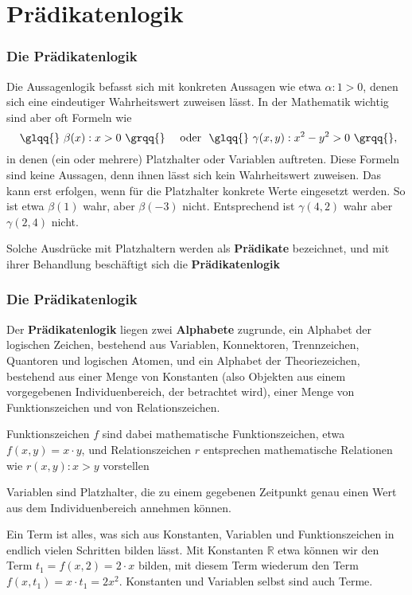 \documentclass[hyperref={pdfpagelabels=false}]{beamer}
\theoremstyle{plain}%
\theoremstyle{definition}
\theoremstyle{remark}
\begin{document}
\section{Prädikatenlogik}

\begin{frame}
\frametitle{Die Prädikatenlogik}

Die Aussagenlogik befasst sich mit konkreten Aussagen wie etwa \glqq{}$\alpha: 1>0$\grqq{}, denen sich 
eine eindeutiger Wahrheitswert zuweisen lässt. In der Mathematik  wichtig sind aber oft Formeln 
wie 
	$$ \text{ \glqq{} } \beta(x): x >0 \,\,\text{\grqq{}} \quad \text{ oder } \,\, 
	\text{\glqq{}}\,\, \gamma(x,y): x^2-y^2 > 0\,\,  \text{\grqq{}}, $$ 
in denen 
(ein oder mehrere) Platzhalter oder Variablen auftreten. \pause Diese Formeln sind keine Aussagen, 
denn ihnen lässt sich kein Wahrheitswert zuweisen. Das kann erst erfolgen, wenn für die Platzhalter 
konkrete Werte eingesetzt werden. \pause So ist etwa $\beta(1)$ wahr, aber $\beta(-3)$ nicht.  \pause 
Entsprechend ist $\gamma(4,2)$ wahr aber $\gamma(2,4)$ nicht. 

\pause 

\bigbreak

Solche Ausdrücke mit Platzhaltern werden als \textbf{Prädikate} bezeichnet, und mit ihrer Behandlung 
beschäftigt sich die \textbf{Prädikatenlogik}
\end{frame}

\begin{frame}
\frametitle{Die Prädikatenlogik}

Der \textbf{Prädikatenlogik} liegen zwei \textbf{Alphabete} zugrunde, 
ein Alphabet der logischen Zeichen, bestehend aus Variablen, Konnektoren, Trennzeichen, 
Quantoren und logischen Atomen, und ein Alphabet der Theoriezeichen, bestehend aus einer Menge 
von Konstanten (also Objekten  aus einem vorgegebenen Individuenbereich, der 
betrachtet wird), einer Menge von Funktionszeichen und von Relationszeichen. 

\pause

Funktionszeichen $f$ sind dabei mathematische Funktionszeichen, etwa 
$f(x, y) = x \cdot y$, und Relationszeichen $r$ entsprechen mathematische Relationen wie 
$r(x,y) : x > y$ vorstellen

\pause

Variablen sind Platzhalter, die zu 
einem gegebenen Zeitpunkt genau einen Wert aus dem Individuenbereich annehmen können. 

\pause

Ein Term ist alles, was sich aus Konstanten, Variablen und Funktionszeichen in endlich 
vielen Schritten bilden lässt. Mit  Konstanten $\mathbb R$ etwa können wir den Term $t_1 = f(x,2) = 
2 \cdot x$ bilden, mit diesem Term wiederum den Term $f(x, t_1) = x \cdot t_1 = 2x^2$. Konstanten 
und Variablen selbst sind auch Terme.

\end{frame}
\end{document}
